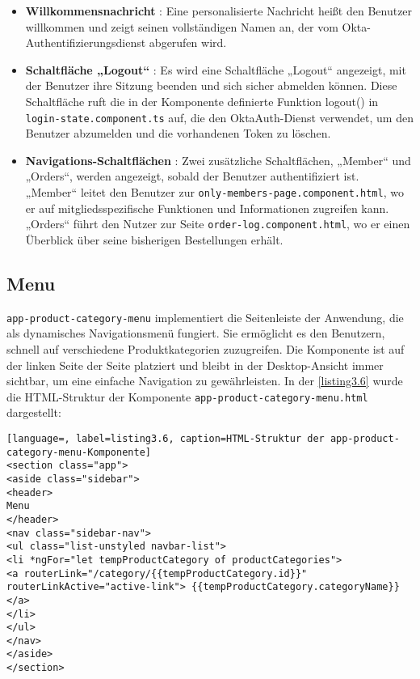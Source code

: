 \begin{itemize}
	\item \textbf{Willkommensnachricht} : Eine personalisierte Nachricht heißt den Benutzer willkommen und zeigt seinen vollständigen Namen an, der vom Okta-Authentifizierungsdienst abgerufen wird.
	\item \textbf{Schaltfläche „Logout“} : Es wird eine Schaltfläche „Logout“ angezeigt, mit der Benutzer ihre Sitzung beenden und sich sicher abmelden können. Diese Schaltfläche ruft die in der Komponente definierte Funktion logout() in \verb*|login-state.component.ts| auf, die den OktaAuth-Dienst verwendet, um den Benutzer abzumelden und die vorhandenen Token zu löschen. 
	\item \textbf{Navigations-Schaltflächen} : Zwei zusätzliche Schaltflächen, „Member“ und „Orders“, werden angezeigt, sobald der Benutzer authentifiziert ist.\\ 
	„Member“ leitet den Benutzer zur \verb*|only-members-page.component.html|, wo er auf mitgliedsspezifische Funktionen und Informationen zugreifen kann.\\
	„Orders“ führt den Nutzer zur Seite \verb*|order-log.component.html|, wo er einen Überblick über seine bisherigen Bestellungen erhält.
\end{itemize}

\subsection{Menu}

\verb*|app-product-category-menu| implementiert die Seitenleiste der Anwendung, die als dynamisches Navigationsmenü fungiert. Sie ermöglicht es den Benutzern, schnell auf verschiedene Produktkategorien zuzugreifen. Die Komponente ist auf der linken Seite der Seite platziert und bleibt in der Desktop-Ansicht immer sichtbar, um eine einfache Navigation zu gewährleisten. In der \ref{listing3.6} wurde die HTML-Struktur der Komponente \verb*|app-product-category-menu.html| dargestellt:

\begin{lstlisting}[language=, label=listing3.6, caption=HTML-Struktur der app-product-category-menu-Komponente]
<section class="app">
<aside class="sidebar">
<header>
Menu
</header>
<nav class="sidebar-nav">
<ul class="list-unstyled navbar-list">
<li *ngFor="let tempProductCategory of productCategories">
<a routerLink="/category/{{tempProductCategory.id}}" 
routerLinkActive="active-link"> {{tempProductCategory.categoryName}}
</a>
</li>
</ul>
</nav>
</aside>
</section>
\end{lstlisting}

